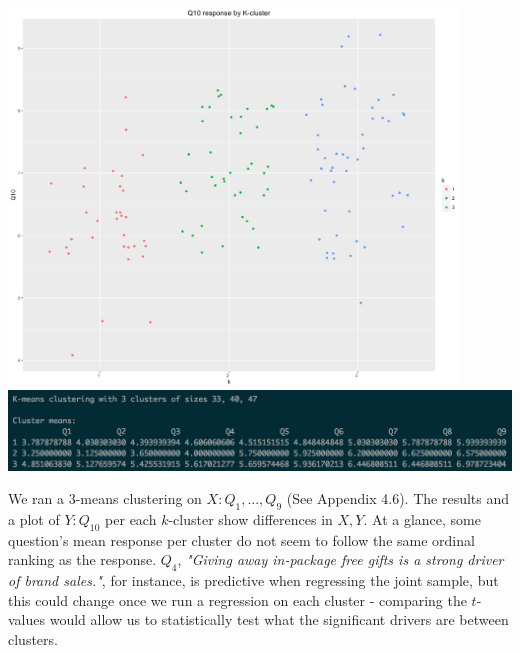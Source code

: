 \documentclass[10pt, oneside,spanish]{article}
\begin{document}
\begin{center}
\includegraphics[width=12cm]{clusters.png}
\includegraphics[width=15cm]{knn.png}
\end{center}

We ran a 3-means clustering on $X: Q_{1},...,Q_{9} $ (See Appendix 4.6). The results and a plot of $Y: Q_{10}$ per each $k$-cluster show differences in $X,Y$. At a glance, some question's mean response per cluster do not seem to follow the same ordinal ranking as the response. $Q_{4}$, \textit{"Giving away in-package free gifts is a strong driver of brand sales."}, for instance, is predictive when regressing the joint sample, but this could change once we run a regression on each cluster - comparing the $t$-values would allow us to statistically test what the significant drivers are between clusters.
\end{document}
